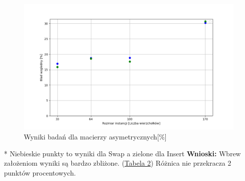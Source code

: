 \documentclass{article}
\begin{document}
        \begin{figure}[ht]
          \centering
          \includegraphics[width=\textwidth]{src/plots/asymTsNeighMet.png}
          \caption{Wyniki badań dla macierzy asymetrycznych[\%]}
          \label{fig:asymNeighg}
        \end{figure}
        \FloatBarrier
        * Niebieskie punkty to wyniki dla Swap a zielone dla Insert
        \textbf{Wnioski: } Wbrew założeniom wyniki są bardzo zbliżone. (\hyperref[tab:error_TsNeighMet]{Tabela 2})
        Różnica nie przekracza 2 punktów procentowych.
\end{document}
